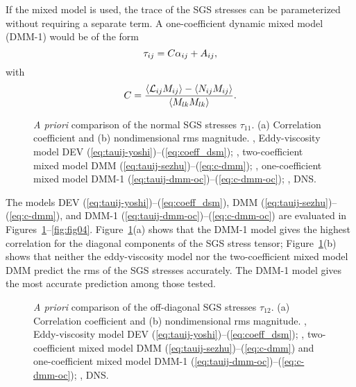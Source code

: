 \documentclass[tcfd]{svjour}
\begin{document}
If the mixed model is used, the trace of the SGS stresses can be
parameterized without requiring a separate term. A one-coeff\/icient
dynamic mixed model (DMM-1) would be of the form
\begin{equation}
 \label{eq:tauij-dmm-oc}
 \tau_{ij} = C \alpha_{ij} + A_{ij} ,
\end{equation}
with
\begin{equation}
 \label{eq:c-dmm-oc}
 C = \frac{\langle\Lij\Mij\rangle - \langle\Nij\Mij\rangle}
 {\langle\Mlk\Mlk\rangle}.
\end{equation}

\begin{figure}[b]
\vspace{84mm}%
\caption{{\it A priori} comparison of the normal SGS stresses
$\tau_{11}$. (a) Correlation coeff\/icient and (b) nondimensional rms magnitude. \solid,
Eddy-viscosity model DEV (\protect\ref{eq:tauij-yoshi})--(\protect\ref{eq:coeff_dsm});
\dashed, two-coeff\/icient mixed model DMM
(\protect\ref{eq:tauij-sezhu})--(\protect\ref{eq:c-dmm}); \chndot, one-coeff\/icient mixed model
DMM-1 (\protect\ref{eq:tauij-dmm-oc})--(\protect\ref{eq:c-dmm-oc}); \trian, DNS.}
\label{fig:fig02}
\end{figure}

The models DEV (\ref{eq:tauij-yoshi})--(\ref{eq:coeff_dsm}), DMM
(\ref{eq:tauij-sezhu})--(\ref{eq:c-dmm}), and DMM-1
(\ref{eq:tauij-dmm-oc})--(\ref{eq:c-dmm-oc}) are evaluated in
Figures~\ref{fig:fig02}--\ref{fig:fig04}. Figure~\ref{fig:fig02}(a) shows that the DMM-1 model gives the highest
correlation for the diagonal components of the SGS stress tensor;
Figure~\ref{fig:fig02}(b) shows that neither the eddy-viscosity model nor the
two-coeff\/icient mixed model DMM predict the rms of the SGS stresses
accurately. The DMM-1 model gives the most accurate prediction among
those tested.

\begin{figure}[t]
\vspace{86mm}%
\caption{{\it A priori} comparison of the off-diagonal SGS stresses
$\tau_{12}$. (a) Correlation coeff\/icient and (b) nondimensional rms magnitude. \solid,
Eddy-viscosity model DEV (\protect\ref{eq:tauij-yoshi})--(\protect\ref{eq:coeff_dsm}); \dashed,
two-coeff\/icient mixed model DMM (\protect\ref{eq:tauij-sezhu})--(\protect\ref{eq:c-dmm}) and
one-coeff\/icient mixed model DMM-1 (\protect\ref{eq:tauij-dmm-oc})--(\protect\ref{eq:c-dmm-oc});
\trian, DNS.}
\label{fig:fig03}
\end{figure}
\end{document}
